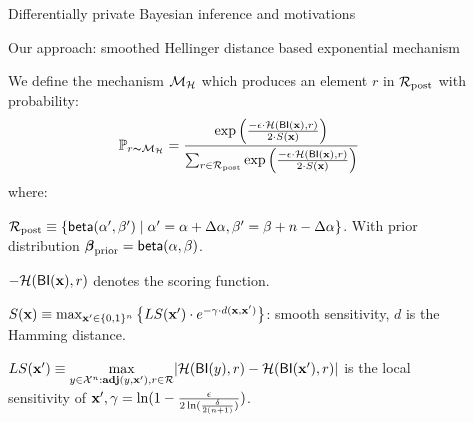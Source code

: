 \documentclass[final,hyperref={pdfpagelabels=false}]{beamer}
\begin{document}
\begin{frame}[t]
\begin{columns}[t]
\begin{column}{.485\textwidth}
\begin{block}{Differentially private Bayesian inference and motivations}
\end{block}



\begin{block}{Our approach: smoothed Hellinger distance based exponential mechanism}

We define the mechanism $\mathcal{M}_{\mathcal{H}}$ which produces an element $r$ in $\mathcal{R}_{\textup{post}}$ with probability:
\[
\mathbb{P}_{r \thicksim \mathcal{M}_{\mathcal{H}}} =
\frac 
{\exp \Big(\frac{-\epsilon\cdot\mathcal{H}(\mathsf{BI}(\textbf{x}),r)}{2\cdot S(\textbf{x})}\Big)}
{\sum_{r\in\mathcal{R}_{\textup{post}}} \exp \Big(\frac{-\epsilon\cdot\mathcal{H}(\mathsf{BI}(\textbf{x}),r)}{2\cdot S(\textbf{x})}\Big)}
\]
where:
\begin{itemize}
 \small{ \item  $\mathcal{R}_{\textup{post}}\equiv\{\mathsf{beta}(\alpha',\beta')\mid \alpha'=\alpha+\Delta\alpha, \beta'=\beta+n-\Delta\alpha\}$. With prior distribution $\boldsymbol{\beta}_{\textup{prior}}=\mathsf{beta}(\alpha, \beta)$.}
  \item \small{$-\mathcal{H}(\mathsf{BI}(\textbf{x}),r)$ denotes the scoring function.}

  \item \small{$S(\textbf{x})\equiv \max_{\textbf{x}' \in \{0,1\}^{n}}\big\{ LS(\textbf{x}') \cdot e^{-\gamma\cdot d(\textbf{x},\textbf{x}')}\big\}$: smooth sensitivity\cite{nissim2007smooth}}, $d$ is the
    Hamming distance.
   \item \small{$LS(\textbf{x}')\equiv\max\limits_{y\in \mathcal{X}^n:\textbf{adj}(y,\textbf{x}'), r\in \mathcal{R}}\lvert \mathcal{H}(\mathsf{BI}(y), r) - \mathcal{H}(\mathsf{BI}(\textbf{x}'), r)\rvert$ is the local sensitivity of $\textbf{x}',\gamma =   \ln(1 - \frac{\epsilon}{2 \ln (\frac{\delta}{2 (n + 1)})})$}.
 \end{itemize}


\end{block}


\end{column} %

\begin{column}{.01\textwidth}\end{column} %
 
\begin{column}{.485\textwidth} %







\end{column}
\end{columns}
\end{frame}
\end{document}
